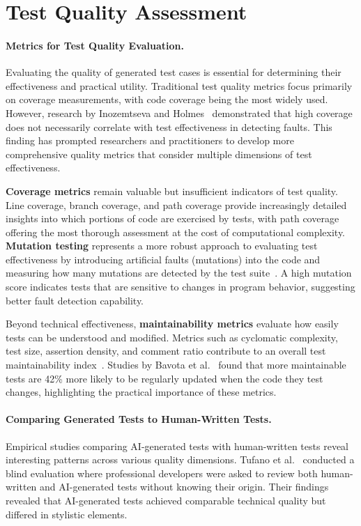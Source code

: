 \section{Test Quality Assessment}

\paragraph{Metrics for Test Quality Evaluation.} Evaluating the quality of generated test cases is essential for determining their effectiveness and practical utility. Traditional test quality metrics focus primarily on coverage measurements, with code coverage being the most widely used. However, research by Inozemtseva and Holmes~\cite{TestCoverageLimitations} demonstrated that high coverage does not necessarily correlate with test effectiveness in detecting faults. This finding has prompted researchers and practitioners to develop more comprehensive quality metrics that consider multiple dimensions of test effectiveness.

\hspace{0.5cm} \textbf{Coverage metrics} remain valuable but insufficient indicators of test quality. Line coverage, branch coverage, and path coverage provide increasingly detailed insights into which portions of code are exercised by tests, with path coverage offering the most thorough assessment at the cost of computational complexity. \textbf{Mutation testing} represents a more robust approach to evaluating test effectiveness by introducing artificial faults (mutations) into the code and measuring how many mutations are detected by the test suite~\cite{MutationTesting}. A high mutation score indicates tests that are sensitive to changes in program behavior, suggesting better fault detection capability.

\hspace{0.5cm} Beyond technical effectiveness, \textbf{maintainability metrics} evaluate how easily tests can be understood and modified. Metrics such as cyclomatic complexity, test size, assertion density, and comment ratio contribute to an overall test maintainability index~\cite{TestMaintainability}. Studies by Bavota et al.~\cite{TestReadability} found that more maintainable tests are 42\% more likely to be regularly updated when the code they test changes, highlighting the practical importance of these metrics.

\paragraph{Comparing Generated Tests to Human-Written Tests.} Empirical studies comparing AI-generated tests with human-written tests reveal interesting patterns across various quality dimensions. Tufano et al.~\cite{HumanVsAITests} conducted a blind evaluation where professional developers were asked to review both human-written and AI-generated tests without knowing their origin. Their findings revealed that AI-generated tests achieved comparable technical quality but differed in stylistic elements.

